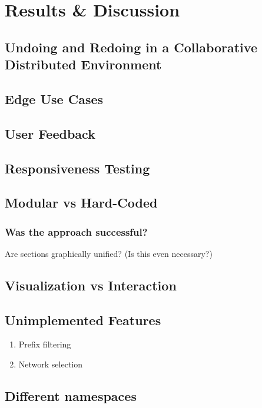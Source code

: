\chapter{Results \& Discussion}

\section{Undoing and Redoing in a Collaborative Distributed Environment}

\section{Edge Use Cases}

\section{User Feedback}

\section{Responsiveness Testing}

\section{Modular vs Hard-Coded}
\subsection{Was the approach successful?}
Are sections graphically unified? (Is this even necessary?)
	
\section{Visualization vs Interaction}

\section{Unimplemented Features}
	\begin{enumerate}
		\item Prefix filtering
		\item Network selection
	\end{enumerate}

\section{Different namespaces}

